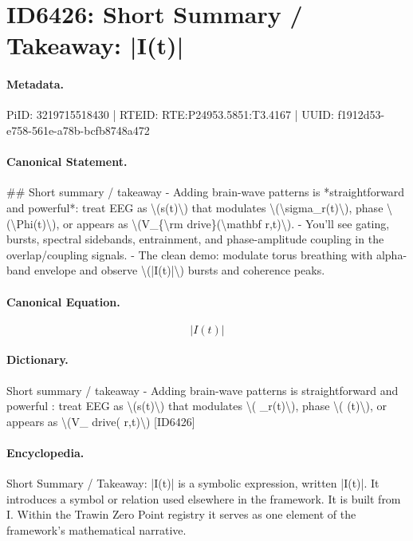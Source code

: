 \section*{ID6426: Short Summary / Takeaway: |I(t)|}
\paragraph{Metadata.}
PiID: 3219715518430 | RTEID: RTE:P24953.5851:T3.4167 | UUID: f1912d53-e758-561e-a78b-bcfb8748a472

\paragraph{Canonical Statement.}
\#\# Short summary / takeaway - Adding brain-wave patterns is *straightforward and powerful*: treat EEG as \textbackslash{}(s(t)\textbackslash{}) that modulates \textbackslash{}(\textbackslash{}sigma\_r(t)\textbackslash{}), phase \textbackslash{}(\textbackslash{}Phi(t)\textbackslash{}), or appears as \textbackslash{}(V\_\{\textbackslash{}rm drive\}(\textbackslash{}mathbf r,t)\textbackslash{}). - You’ll see gating, bursts, spectral sidebands, entrainment, and phase-amplitude coupling in the overlap/coupling signals. - The clean demo: modulate torus breathing with alpha-band envelope and observe \textbackslash{}(|I(t)|\textbackslash{}) bursts and coherence peaks.

\paragraph{Canonical Equation.}
\[
|I(t)|
\]

\paragraph{Dictionary.}
Short summary / takeaway - Adding brain-wave patterns is straightforward and powerful : treat EEG as \textbackslash{}(s(t)\textbackslash{}) that modulates \textbackslash{}( \_r(t)\textbackslash{}), phase \textbackslash{}( (t)\textbackslash{}), or appears as \textbackslash{}(V\_ drive( r,t)\textbackslash{}) [ID6426]

\paragraph{Encyclopedia.}
Short Summary / Takeaway: |I(t)| is a symbolic expression, written |I(t)|. It introduces a symbol or relation used elsewhere in the framework. It is built from I. Within the Trawin Zero Point registry it serves as one element of the framework's mathematical narrative.
